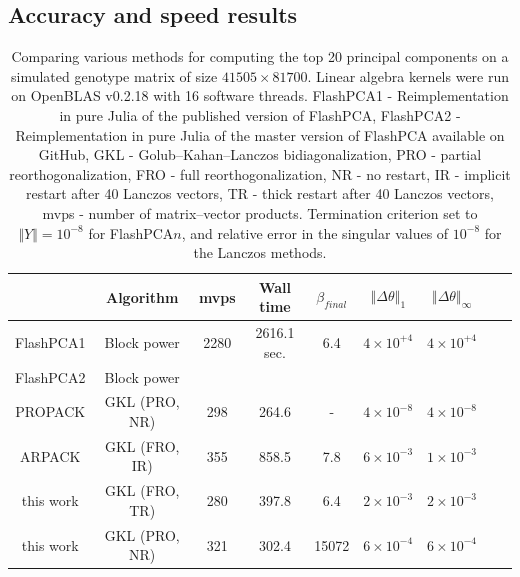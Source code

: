 \documentclass[final,leqno]{siamltex1213}
\begin{document}
\subsection{Accuracy and speed results}

\begin{table}
\begin{tabular}{|c|c|c|c|c|c|c|c|c|}
\hline
 & Algorithm & mvps & Wall time & $\beta_{final}$ & $\left\Vert \Delta\theta\right\Vert _{1}$ & $\left\Vert \Delta\theta\right\Vert _{\infty}$\tabularnewline
\hline
\hline
FlashPCA1 & Block power & 2280 & 2616.1 sec. & 6.4 & $4\times10^{+4}$ & $4\times10^{+4}$\tabularnewline
\hline
FlashPCA2 & Block power &  &  &  &  & \tabularnewline
\hline
PROPACK & GKL (PRO, NR) & 298 & 264.6 & - & $4\times10^{-8}$ & $4\times10^{-8}$\tabularnewline
\hline
ARPACK & GKL (FRO, IR) & 355 & 858.5 & 7.8 & $6\times10^{-3}$ & $1\times10^{-3}$\tabularnewline
\hline
this work & GKL (FRO, TR) & 280 & 397.8 & 6.4 & $2\times10^{-3}$ & $2\times10^{-3}$\tabularnewline
\hline
this work & GKL (PRO, NR) & 321 & 302.4 & 15072 & $6\times10^{-4}$ & $6\times10^{-4}$\tabularnewline
\hline
\end{tabular}

\caption{Comparing various methods for computing the top 20 principal
components on a simulated genotype matrix of size $41505\times81700$.
Linear algebra kernels were run on OpenBLAS v0.2.18 with 16 software threads.
FlashPCA1 - Reimplementation in pure Julia of the published version of FlashPCA,
FlashPCA2 - Reimplementation in pure Julia of the master version of FlashPCA available on GitHub,
GKL - Golub--Kahan--Lanczos bidiagonalization,
PRO - partial reorthogonalization,
FRO - full reorthogonalization,
NR - no restart,
IR - implicit restart after 40 Lanczos vectors,
TR - thick restart after 40 Lanczos vectors,
mvps - number of matrix--vector products.
Termination criterion set to $\Vert Y\Vert = 10^{-8}$ for FlashPCA$n$,
and relative error in the singular values of $10^{-8}$ for the Lanczos methods.
}
\end{table}
\end{document}
